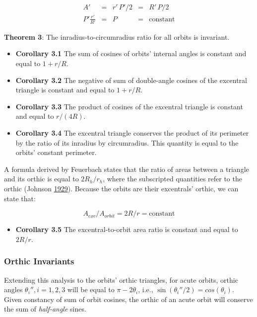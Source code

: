 \documentclass[]{article}
\providecommand{\tightlist}{%
  \setlength{\itemsep}{0pt}\setlength{\parskip}{0pt}}
\begin{document}
\[
\begin{array}{rclll}
A' & = & r'\,P'/2 & = & R'\,P/2 \\
P'\frac{r'}{R'} & = & P & = & \text{constant}
\end{array}
\]

\textbf{Theorem 3}: The inradius-to-circumradius ratio for all orbits is invariant.

\begin{itemize}
\tightlist
\item
  \textbf{Corollary 3.1} The sum of cosines of orbits' internal angles is constant and equal to \(1+r/R\).
\item
  \textbf{Corollary 3.2} The negative of sum of double-angle cosines of the excentral triangle is constant and equal to \(1+r/R\).
\item
  \textbf{Corollary 3.3} The product of cosines of the excentral triangle is constant and equal to \(r/(4R)\).
\item
  \textbf{Corollary 3.4} The excentral triangle conserves the product of its perimeter by the ratio of its inradius by circumradius. This quantity is equal to the orbits' constant perimeter.
\end{itemize}

A formula derived by Feuerbach states that the ratio of areas between a triangle and its orthic is equal to \(2R_h/r_h\), where the subscripted quantities refer to the orthic (Johnson \protect\hyperlink{ref-johnson29}{1929}). Because the orbits are their excentrals' orthic, we can state that:

\[
A_{exc}/A_{orbit} = 2R/r = \mbox{constant}
\]

\begin{itemize}
\tightlist
\item
  \textbf{Corollary 3.5} The excentral-to-orbit area ratio is constant and equal to \(2R/r\).
\end{itemize}

\hypertarget{orthic-invariants}{%
\subsubsection{Orthic Invariants}\label{orthic-invariants}}

Extending this analysis to the orbits' orthic triangles, for acute orbits, orthic angles \(\theta_i'', i=1,2,3\) will be equal to \(\pi-2\theta_i\), i.e., \(\sin(\theta_i''/2)=cos(\theta_i)\). Given constancy of sum of orbit cosines, the orthic of an acute orbit will conserve the sum of \emph{half-angle} sines.
\end{document}
